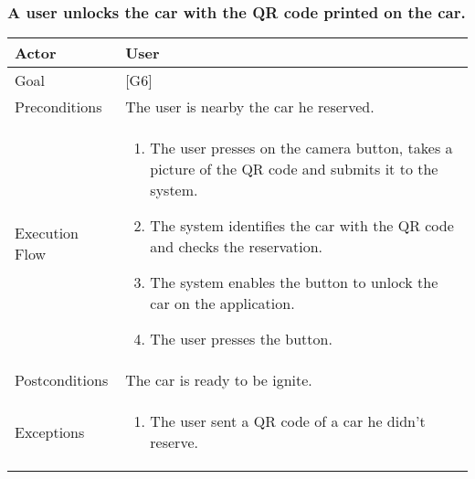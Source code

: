 \documentclass{article}
\begin{document}
	\subsubsection{A user unlocks the car with the QR code printed on the car.}
	\begin{tabularx}{\textwidth}{  l  X  }
		\hline
		Actor & User\\
		\hline
		Goal & [G6]\\
		\hline
		Preconditions & The user is nearby the car he reserved.\\
		\hline
		Execution Flow & \begin{enumerate}
			\item{The user presses on the camera button, takes a picture of the QR code and submits it to the system.}
										 \item{The system identifies the car with the QR code and checks the reservation.}
										 \item{The system enables the button to unlock the car on the application.}
										 \item{The user presses the button.}
										\end{enumerate}\\
		\hline
		Postconditions & The car is ready to be ignite.\\
		\hline
		Exceptions & \begin{enumerate}
			\item{The user sent a QR code of a car he didn't reserve.}
	\end{enumerate}\\
		\hline
	\end{tabularx}
\end{document}
